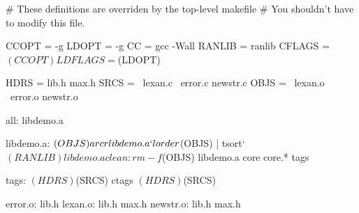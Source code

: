 # These definitions are overriden by the top-level makefile
# You shouldn't have to modify this file.

CCOPT         = -g
LDOPT         = -g
CC            = gcc -Wall
RANLIB        = ranlib
CFLAGS        = $(CCOPT)
LDFLAGS       = $(LDOPT)

HDRS          = lib.h max.h
SRCS          = \
                lexan.c \
                error.c newstr.c
OBJS          = \
                lexan.o \
                error.o newstr.o

all:            libdemo.a

libdemo.a:      $(OBJS)
                ar cr libdemo.a `lorder $(OBJS) | tsort`
                $(RANLIB) libdemo.a

clean:
                rm -f $(OBJS) libdemo.a core core.* tags

tags:           $(HDRS) $(SRCS)
                ctags $(HDRS) $(SRCS)

error.o:        lib.h
lexan.o:        lib.h max.h
newstr.o:       lib.h max.h
